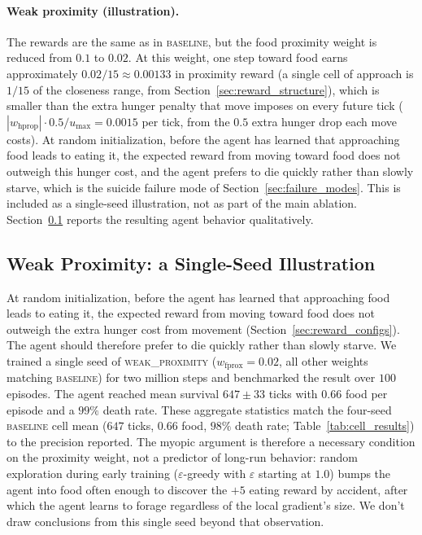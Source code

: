 \documentclass[12pt,a4paper,titlepage]{article}
\begin{document}
\paragraph{Weak proximity (illustration).} The rewards are the same as in \textsc{baseline}, but the food proximity weight is reduced from $0.1$ to $0.02$. At this weight, one step toward food earns approximately $0.02 / 15 \approx 0.00133$ in proximity reward (a single cell of approach is $1/15$ of the closeness range, from Section~\ref{sec:reward_structure}), which is smaller than the extra hunger penalty that move imposes on every future tick ($|w_\text{hprop}| \cdot 0.5 / u_\text{max} = 0.0015$ per tick, from the $0.5$ extra hunger drop each move costs). At random initialization, before the agent has learned that approaching food leads to eating it, the expected reward from moving toward food does not outweigh this hunger cost, and the agent prefers to die quickly rather than slowly starve, which is the suicide failure mode of Section~\ref{sec:failure_modes}. This is included as a single-seed illustration, not as part of the main ablation. Section~\ref{sec:weak_prox} reports the resulting agent behavior qualitatively.

\subsection{Weak Proximity: a Single-Seed Illustration}
\label{sec:weak_prox}

At random initialization, before the agent has learned that approaching food leads to eating it, the expected reward from moving toward food does not outweigh the extra hunger cost from movement (Section~\ref{sec:reward_configs}). The agent should therefore prefer to die quickly rather than slowly starve. We trained a single seed of \textsc{weak\_proximity} ($w_\text{fprox}=0.02$, all other weights matching \textsc{baseline}) for two million steps and benchmarked the result over $100$ episodes. The agent reached mean survival $647 \pm 33$ ticks with $0.66$ food per episode and a $99\%$ death rate. These aggregate statistics match the four-seed \textsc{baseline} cell mean ($647$ ticks, $0.66$ food, $98\%$ death rate; Table~\ref{tab:cell_results}) to the precision reported. The myopic argument is therefore a necessary condition on the proximity weight, not a predictor of long-run behavior: random exploration during early training ($\varepsilon$-greedy with $\varepsilon$ starting at $1.0$) bumps the agent into food often enough to discover the $+5$ eating reward by accident, after which the agent learns to forage regardless of the local gradient's size. We don't draw conclusions from this single seed beyond that observation.
\end{document}
